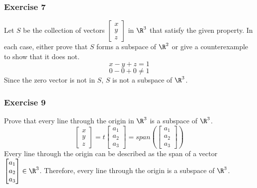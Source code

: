 \documentclass{math}
\begin{document}
\subsubsection*{Exercise 7}
Let \( S \) be the collection of vectors \( \begin{bmatrix}x \\ y \\ z
\end{bmatrix} \) in \( \R^3 \) that satisfy the given property. In each case,
either prove that \( S \) forms a subspace of \( \R^2 \) or give a
counterexample to show that it does not.
\[ x-y+z = 1 \]
\[ 0-0+0 \ne 1 \]
Since the zero vector is not in \( S \), \( S \) is not a subspace of
\( \R^3 \).

\subsubsection*{Exercise 9}
Prove that every line through the origin in \( \R^3 \) is a subspace of
\( \R^3 \).
\[ \begin{bmatrix}x \\ y \\ z\end{bmatrix} =
  t\begin{bmatrix}a_1 \\ a_2 \\ a_3\end{bmatrix} =
  span\left(\begin{bmatrix}a_1 \\ a_2 \\ a_3\end{bmatrix}\right) \]
Every line through the origin can be described as the span of a vector
\( \begin{bmatrix}a_1 \\ a_2 \\ a_3\end{bmatrix}\in\R^3 \). Therefore, every
line through the origin is a subspace of \( \R^3 \).
\end{document}
